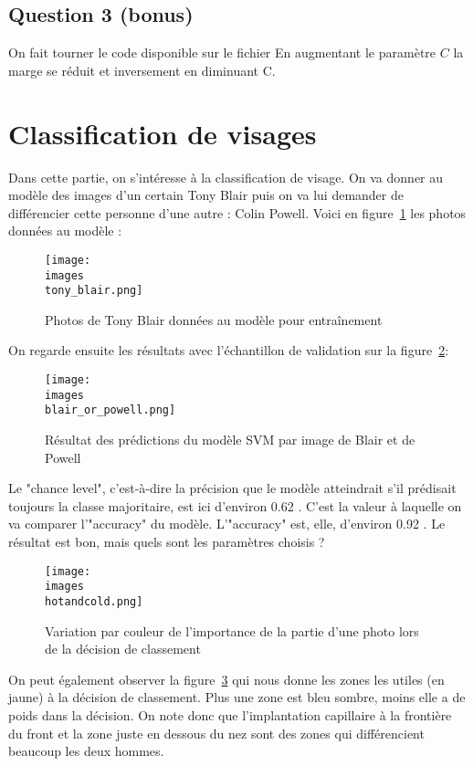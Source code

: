 \documentclass[11pt,a4paper]{article}
\begin{document}
\subsection*{Question 3 (bonus)}
On fait tourner le code disponible sur le fichier 
En augmentant le paramètre $C$ la marge se réduit et inversement en diminuant C.

\section*{Classification de visages}
Dans cette partie, on s'intéresse à la classification de visage. On va donner au modèle des images d'un certain Tony Blair puis on va lui demander de différencier cette personne d'une autre : Colin Powell. Voici en figure~\ref{blair} les photos données au modèle :
\begin{figure}[H]
    \centering
    \texttt{[image: \\images\\tony\_blair.png]}
    \caption{Photos de Tony Blair données au modèle pour entraînement}
    \label{blair}
\end{figure}
On regarde ensuite les résultats avec l'échantillon de validation sur la figure~\ref{blair_or_powell}: \\
\begin{figure}[H]
    \centering
    \texttt{[image: \\images\\blair\_or\_powell.png]}
    \caption{Résultat des prédictions du modèle SVM par image de Blair et de Powell}
    \label{blair_or_powell}
\end{figure}
Le "chance level", c'est-à-dire la précision que le modèle atteindrait s'il prédisait toujours la classe majoritaire, est ici d'environ 0.62 . C'est la valeur à laquelle on va comparer l'"accuracy" du modèle. L'"accuracy" est, elle, d'environ 0.92 . Le résultat est bon, mais quels sont les paramètres choisis ?
\begin{figure}[H]
    \centering
    \texttt{[image: \\images\\hotandcold.png]}
    \caption{Variation par couleur de l'importance de la partie d'une photo lors de la décision de classement}
    \label{hotandcold}
\end{figure}
On peut également observer la figure~\ref{hotandcold} qui nous donne les zones les utiles (en jaune) à la décision de classement. Plus une zone est bleu sombre, moins elle a de poids dans la décision. On note donc que l'implantation capillaire à la frontière du front et la zone juste en dessous du nez sont des zones qui différencient beaucoup les deux hommes.
\end{document}
